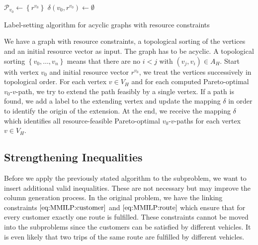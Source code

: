 \begin{algorithm}[hbt]
	\SetAlgoLined
	$\mathcal{P}_{v_0}\gets\left\{r^{v_0}\right\}$ \;
	$\delta\left(v_0,r^{v_0}\right)\gets\emptyset$ \;
	\Return{$\delta$}
	\caption{Label-setting algorithm for acyclic graphs with resource constraints}
\end{algorithm}

We have a graph with resource constraints, a topological sorting of the vertices and an initial resource vector as input. The graph has to be acyclic. A topological sorting ${\left\{v_0,\dots,v_n\right\}}$ means that there are no $i<j$ with ${\left(v_j,v_i\right)\in A_H}$. Start with vertex $v_0$ and initial resource vector $r^{v_0}$, we treat the vertices successively in topological order. For each vertex $v\in V_H$ and for each computed Pareto-optimal $v_0$-$v$-path, we try to extend the path feasibly by a single vertex. If a path is found, we add a label to the extending vertex and update the mapping $\delta$ in order to identify the origin of the extension. At the end, we receive the mapping $\delta$ which identifies all resource-feasible Pareto-optimal $v_0$-$v$-paths for each vertex $v\in V_H$.


\subsection{Strengthening Inequalities}

Before we apply the previously stated algorithm to the subproblem, we want to insert additional valid inequalities. These are not necessary but may improve the column generation process. In the original problem, we have the linking constraints $\eqref{eq:MMILP:customer}$ and $\eqref{eq:MMILP:route}$ which ensure that for every customer exactly one route is fulfilled. These constraints cannot be moved into the subproblems since the customers can be satisfied by different vehicles. It is even likely that two trips of the same route are fulfilled by different vehicles.

